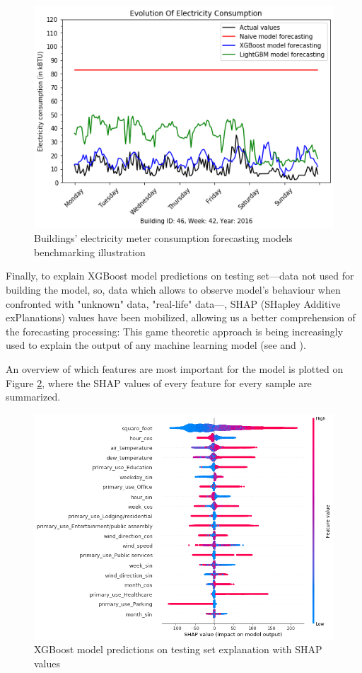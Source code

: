 \documentclass[twocolumn, switch]{article}
\begin{document}
\begin{figure}[H]
\centering
\includegraphics[scale=0.35]{../graphs/sample_electricity_consumption_comparison}
\caption{Buildings' electricity meter consumption forecasting models benchmarking illustration}
\label{fig:electricity_benchmarking_illustration}
\end{figure}

Finally, to explain XGBoost model predictions on testing set---data not used for building the model, so, data which allows to observe model's behaviour when confronted with "unknown" data, "real-life" data---, SHAP (SHapley Additive exPlanations) values have been mobilized, allowing us a better comprehension of the forecasting processing: This game theoretic approach is being increasingly used to explain the output of any machine learning model (see \cite{Lundberg_2017} and \cite{Lundberg_2020}).

An overview of which features are most important for the model is plotted on Figure \ref{fig:shap_values_summary_plot_electricity}, where the SHAP values of every feature for every sample are summarized.

\begin{figure}[H]
\centering
\includegraphics[scale=0.3]{../graphs/shap_values_summary_plot_electricity}
\caption{XGBoost model predictions on testing set explanation with SHAP values}
\label{fig:shap_values_summary_plot_electricity}
\end{figure}
\end{document}
